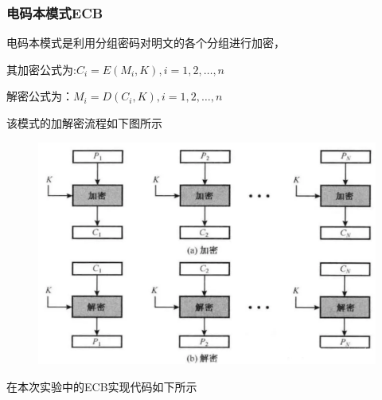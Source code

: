 \documentclass[a4paper,11pt,UTF8]{ctexart}
\newcommand{\bottomcaption}{%
\setlength{\abovecaptionskip}{6pt}%
\setlength{\belowcaptionskip}{6pt}%
\caption}
\newcommand{\xiaowuhao}{\fontsize{9pt}{\baselineskip}\selectfont}   %
\begin{document}
        \subsubsection{电码本模式ECB}
            电码本模式是利用分组密码对明文的各个分组进行加密，\par
            其加密公式为:$C_{i}=E(M_{i},K), i=1,2,\dots ,n$\par
            解密公式为：$M_{i}=D(C_{i},K), i=1,2,\dots ,n$\par
            该模式的加解密流程如下图所示
            \begin{figure}[H]
                \centering
                \includegraphics[width=13cm]{ECB.png}
                \bottomcaption{\xiaowuhao{ECB加解密流程}}
            \end{figure}
            在本次实验中的ECB实现代码如下所示
            
\newpage
\end{document}
